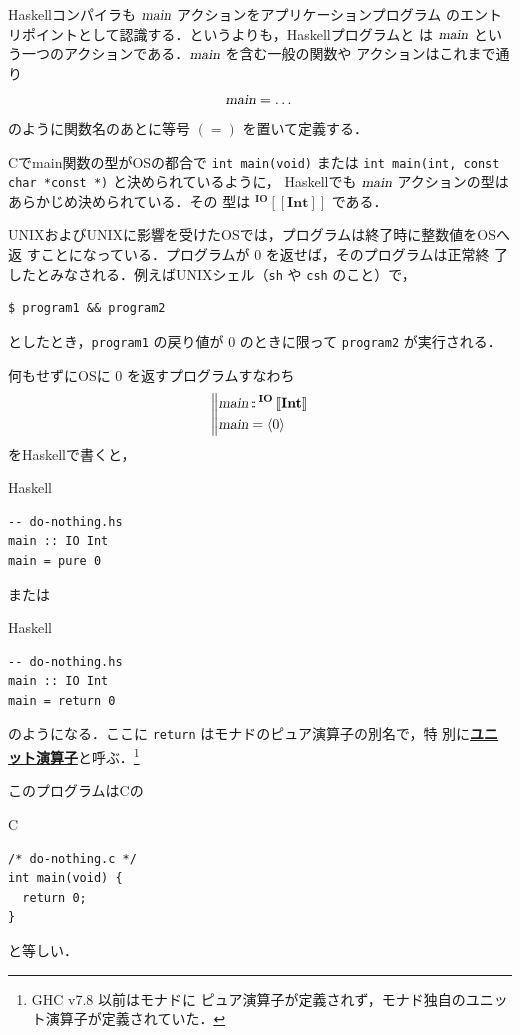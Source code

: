 \documentclass[a5paper,twoside,fleqn,draft]{jsbook}
\def\[{\left[\!\left[}
\def\]{\right]\!\right]}
\newcommand{\programminglanguage}[1]{\textsf{#1}}
\newcommand{\clang}{\programminglanguage{C}}
\newcommand{\haskell}{\programminglanguage{Haskell}}
\newcommand{\keyword}[1]{{\underline{\textbf{#1}}}}
\newcommand{\code}[1]{\texttt{#1}}
\newcommand{\filename}[1]{\texttt{#1}}
\newenvironment{ccode}{\begin{itembox}[r]{\clang}}{\end{itembox}}
\newenvironment{haskellcode}{\begin{itembox}[r]{\haskell}}{\end{itembox}}
\newcommand{\mBrace}{\Vert}
\newcommand{\mAction}[1]{\textsl{#1}}
\DeclareMathOperator{\mMain}{\mAction{main}}
\DeclareMathOperator{\mIn}{{:\!:}}
\newcommand{\mType}[1]{\mathbf{#1}}
\newcommand{\mIntType}{\mType{Int}}
\newcommand{\mGenericTypeAssemble}[2]{{}^{\mType{#1}}\[\mType{#2}\]}
\newcommand{\mIOType}[1]{\mGenericTypeAssemble{IO}{#1}}
\newcommand{\mIOIntType}{\mIOType{\mIntType}}
\newcommand{\mPureWith}[1]{\langle#1\rangle}
\begin{document}
\haskell コンパイラも $\mMain$ アクションをアプリケーションプログラム
のエントリポイントとして認識する．というよりも，\haskell プログラムと
は $\mMain$ という一つのアクションである．$\mMain$ を含む一般の関数や
アクションはこれまで通り
\begin{equation}
\mMain=\dots
\end{equation}
のように関数名のあとに等号 $(=)$ を置いて定義する．

\clang でmain関数の型がOSの都合で \code{int main(void)} または
\code{int main(int, const char *const *)} と決められているように，
\haskell でも $\mMain$ アクションの型はあらかじめ決められている．その
型は $\mIOIntType$ である．

UNIXおよびUNIXに影響を受けたOSでは，プログラムは終了時に整数値をOSへ返
すことになっている．プログラムが $0$ を返せば，そのプログラムは正常終
了したとみなされる．例えばUNIXシェル（\filename{sh} や \filename{csh}
  のこと）で，
\begin{verbatim}
$ program1 && program2
\end{verbatim}
としたとき，\filename{program1} の戻り値が $0$ のときに限って
\filename{program2} が実行される．

何もせずにOSに $0$ を返すプログラムすなわち
\begin{equation}
\left\mBrace
\begin{aligned}
\mMain&\mIn{}\mIOIntType\\
\mMain&=\mPureWith{0}
\end{aligned}
\right.
\end{equation}
を\haskell で書くと，
\begin{haskellcode}
\begin{verbatim}
-- do-nothing.hs
main :: IO Int
main = pure 0
\end{verbatim}
\end{haskellcode}
または
\begin{haskellcode}
\begin{verbatim}
-- do-nothing.hs
main :: IO Int
main = return 0
\end{verbatim}
\end{haskellcode}
のようになる．ここに \code{return} はモナドのピュア演算子の別名で，特
別に\keyword{ユニット演算子}と呼ぶ．\footnote{GHC v7.8 以前はモナドに
  ピュア演算子が定義されず，モナド独自のユニット演算子が定義されていた．}

このプログラムは\clang の
\begin{ccode}
\begin{verbatim}
/* do-nothing.c */
int main(void) {
  return 0;
}
\end{verbatim}
\end{ccode}
と等しい．
\end{document}
